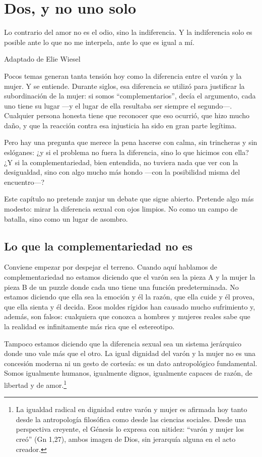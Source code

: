 \chapter{Dos, y no uno solo}

\epigraph{Lo contrario del amor no es el odio, sino la indiferencia. Y la indiferencia solo es posible ante lo que no me interpela, ante lo que es igual a mí.}{Adaptado de Elie Wiesel}

Pocos temas generan tanta tensión hoy como la diferencia entre el varón y la mujer. Y se entiende. Durante siglos, esa diferencia se utilizó para justificar la subordinación de la mujer: si somos ``complementarios'', decía el argumento, cada uno tiene su lugar ---y el lugar de ella resultaba ser siempre el segundo---. Cualquier persona honesta tiene que reconocer que eso ocurrió, que hizo mucho daño, y que la reacción contra esa injusticia ha sido en gran parte legítima.

Pero hay una pregunta que merece la pena hacerse con calma, sin trincheras y sin eslóganes: ¿y si el problema no fuera la diferencia, sino lo que hicimos con ella? ¿Y si la complementariedad, bien entendida, no tuviera nada que ver con la desigualdad, sino con algo mucho más hondo ---con la posibilidad misma del encuentro---?

Este capítulo no pretende zanjar un debate que sigue abierto. Pretende algo más modesto: mirar la diferencia sexual con ojos limpios. No como un campo de batalla, sino como un lugar de asombro.

\section{Lo que la complementariedad no es}

Conviene empezar por despejar el terreno. Cuando aquí hablamos de complementariedad no estamos diciendo que el varón sea la pieza A y la mujer la pieza B de un puzzle donde cada uno tiene una función predeterminada. No estamos diciendo que ella sea la emoción y él la razón, que ella cuide y él provea, que ella sienta y él decida. Esos moldes rígidos han causado mucho sufrimiento y, además, son falsos: cualquiera que conozca a hombres y mujeres reales sabe que la realidad es infinitamente más rica que el estereotipo.

Tampoco estamos diciendo que la diferencia sexual sea un sistema jerárquico donde uno vale más que el otro. La igual dignidad del varón y la mujer no es una concesión moderna ni un gesto de cortesía: es un dato antropológico fundamental. Somos igualmente humanos, igualmente dignos, igualmente capaces de razón, de libertad y de amor.\footnote{La igualdad radical en dignidad entre varón y mujer es afirmada hoy tanto desde la antropología filosófica como desde las ciencias sociales. Desde una perspectiva creyente, el Génesis lo expresa con nitidez: ``varón y mujer los creó'' (Gn 1,27), ambos imagen de Dios, sin jerarquía alguna en el acto creador.}

